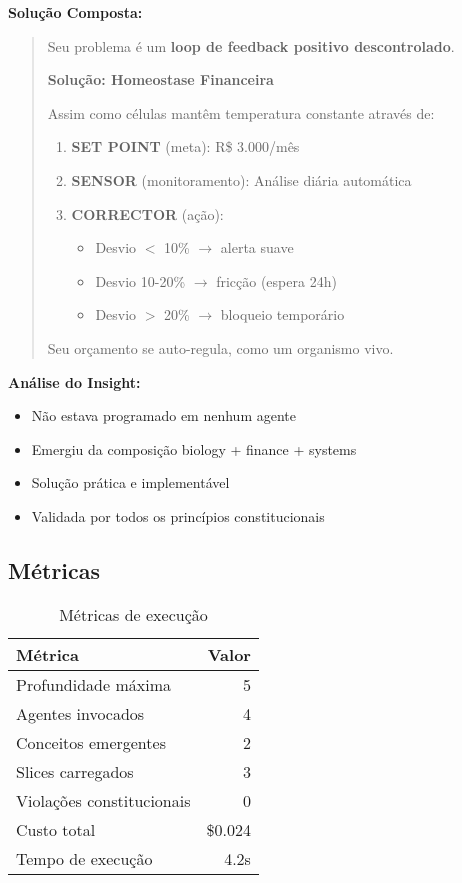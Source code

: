 \documentclass[11pt]{article}
\begin{document}
\textbf{Solução Composta:}

\begin{quote}
Seu problema é um \textbf{loop de feedback positivo descontrolado}.

\textbf{Solução: Homeostase Financeira}

Assim como células mantêm temperatura constante através de:

\begin{enumerate}
    \item \textbf{SET POINT} (meta): R\$ 3.000/mês
    \item \textbf{SENSOR} (monitoramento): Análise diária automática
    \item \textbf{CORRECTOR} (ação):
    \begin{itemize}
        \item Desvio $<$ 10\% $\rightarrow$ alerta suave
        \item Desvio 10-20\% $\rightarrow$ fricção (espera 24h)
        \item Desvio $>$ 20\% $\rightarrow$ bloqueio temporário
    \end{itemize}
\end{enumerate}

Seu orçamento se auto-regula, como um organismo vivo.
\end{quote}

\textbf{Análise do Insight:}

\begin{itemize}
    \item Não estava programado em nenhum agente
    \item Emergiu da composição biology + finance + systems
    \item Solução prática e implementável
    \item Validada por todos os princípios constitucionais
\end{itemize}

\subsection{Métricas}

\begin{table}[H]
\centering
\begin{tabular}{@{}lr@{}}
\toprule
\textbf{Métrica} & \textbf{Valor} \\ \midrule
Profundidade máxima & 5 \\
Agentes invocados & 4 \\
Conceitos emergentes & 2 \\
Slices carregados & 3 \\
Violações constitucionais & 0 \\
Custo total & \$0.024 \\
Tempo de execução & 4.2s \\ \bottomrule
\end{tabular}
\caption{Métricas de execução}
\end{table}
\end{document}
